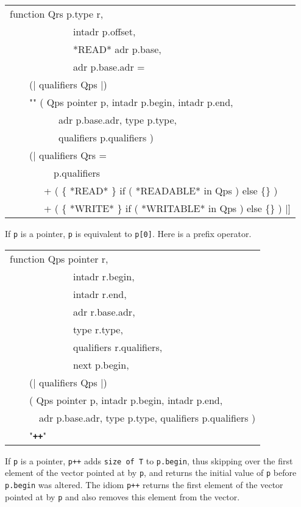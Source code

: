 \documentclass[12pt]{article}
\makeatletter
\newcommand{\TT}[1]{{\tt \bfseries #1}}
\newcommand{\ttmkey}[2]{\TT{#1}\index{#1@{\tt #1}!#2}}
\newenvironment{indpar}[1][0.3in]%
	{\begin{list}{}%
		     {\setlength{\itemsep}{0in}%
		      \setlength{\topsep}{0in}%
		      \setlength{\parsep}{1ex}%
		      \setlength{\labelwidth}{#1}%
		      \setlength{\leftmargin}{#1}%
		      \addtolength{\leftmargin}{\labelsep}}%
	 \item}%
	{\end{list}}
\makeatother
\begin{document}
\begin{indpar}
{\tt\begin{tabular}{@{}l}
function Qrs p.type r, \\
~~~~~~~~~~~~~intadr p.offset, \\
~~~~~~~~~~~~~*READ* adr p.base, \\
~~~~~~~~~~~~~adr p.base.adr = \\
~~~~(| qualifiers Qps |) \\
~~~~"\ttmkey{*}{of pointer}"
        ( Qps pointer p, intadr p.begin, intadr p.end, \\
~~~~~~~~~~adr p.base.adr, type p.type, \\
~~~~~~~~~~qualifiers p.qualifiers ) \\
~~~~(| qualifiers Qrs = \\
~~~~~~~~~p.qualifiers \\
~~~~~~~+ ( \{ *READ* \} if ( *READABLE* in Qps ) else \{\} ) \\
~~~~~~~+ ( \{ *WRITE* \} if ( *WRITABLE* in Qps ) else \{\} )  |] \\
\end{tabular}}

\begin{indpar}
If {\tt p} is a pointer, {\tt *p} is equivalent to {\tt p[0]}.
Here {\tt *} is a prefix operator.
\end{indpar}

{\tt\begin{tabular}{@{}l}
function Qps pointer r, \\
~~~~~~~~~~~~~intadr r.begin, \\
~~~~~~~~~~~~~intadr r.end, \\
~~~~~~~~~~~~~adr r.base.adr, \\
~~~~~~~~~~~~~type r.type, \\
~~~~~~~~~~~~~qualifiers r.qualifiers, \\
~~~~~~~~~~~~~next p.begin, \\
~~~~(| qualifiers Qps |) \\
~~~~( Qps pointer p, intadr p.begin, intadr p.end, \\
~~~~~~adr p.base.adr, type p.type, qualifiers p.qualifiers ) \\
~~~~"\ttmkey{++}{of pointer}" \\
\end{tabular}}

\begin{indpar}
If {\tt p} is a pointer, {\tt p++} adds {\tt size of T} to {\tt p.begin},
thus skipping over the first element of the vector pointed at by {\tt p},
and returns the initial value of {\tt p} before {\tt p.begin} was
altered.  The idiom {\tt *p++} returns the first element of the vector
pointed at by {\tt p} and also removes this element from the vector.


\end{indpar}
\end{indpar}
\end{document}
